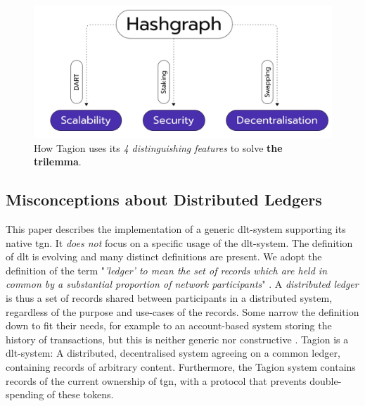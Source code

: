     \begin{figure}[H]
    	\centering
    	\includegraphics[width=1\textwidth]{figures/paper_structure.jpeg}
        \caption{How Tagion uses its \textit{4 distinguishing features} to solve \textbf{the \gls{trilemma}}.}
        \label{figure:paper_structure}
    \end{figure}

    \subsection{Misconceptions about Distributed Ledgers}
    This paper describes the implementation of a generic \gls{dlt}-system supporting its native \gls{tgn}. It \textit{does not} focus on a specific usage of the \gls{dlt}-system. The definition of \gls{dlt} is evolving and many distinct definitions are present. We adopt the definition of the term "\textit{'ledger' to mean the set of records which are held in common by a substantial proportion of network participants}" \cite{dlt_cam}. A \textit{distributed ledger} is thus a set of records shared between participants in a distributed system, regardless of the purpose and use-cases of the records. Some narrow the definition down to fit their needs, for example to an account-based system storing the history of transactions, but this is neither generic nor constructive \cite{dlt_cam}. Tagion is a \gls{dlt}-system: A distributed, decentralised system agreeing on a common ledger, containing records of arbitrary content. Furthermore, the Tagion system contains records of the current ownership of \gls{tgn}, with a protocol that prevents double-spending of these tokens. 

\pagebreak